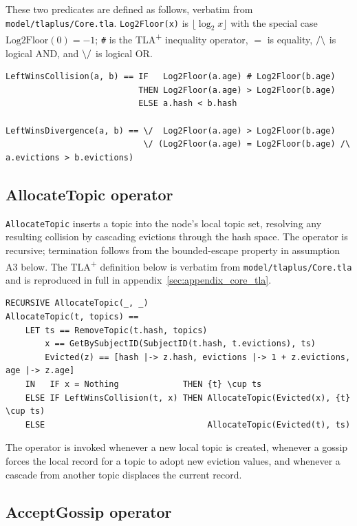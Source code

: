 These two predicates are defined as follows, verbatim from
\texttt{model/tlaplus/Core.tla}. \texttt{Log2Floor(x)} is
$\lfloor \log_2 x \rfloor$ with the special case $\mathrm{Log2Floor}(0) = -1$;
\texttt{\#} is the TLA\textsuperscript{+} inequality operator, $\mathtt{=}$ is
equality, $\mathtt{/\char`\\}$ is logical AND, and $\mathtt{\char`\\/}$ is
logical OR.

\begin{verbatim}
LeftWinsCollision(a, b) == IF   Log2Floor(a.age) # Log2Floor(b.age)
                           THEN Log2Floor(a.age) > Log2Floor(b.age)
                           ELSE a.hash < b.hash

LeftWinsDivergence(a, b) == \/  Log2Floor(a.age) > Log2Floor(b.age)
                            \/ (Log2Floor(a.age) = Log2Floor(b.age) /\ a.evictions > b.evictions)
\end{verbatim}

\subsection{AllocateTopic operator}

\texttt{AllocateTopic} inserts a topic into the node's local topic set, resolving
any resulting collision by cascading evictions through the hash space.
The operator is recursive; termination follows from the bounded-escape property in
assumption A3 below. The TLA\textsuperscript{+} definition below is verbatim
from \texttt{model/tlaplus/Core.tla} and is reproduced in full in
appendix~\ref{sec:appendix_core_tla}.

\begin{verbatim}
RECURSIVE AllocateTopic(_, _)
AllocateTopic(t, topics) ==
    LET ts == RemoveTopic(t.hash, topics)
        x == GetBySubjectID(SubjectID(t.hash, t.evictions), ts)
        Evicted(z) == [hash |-> z.hash, evictions |-> 1 + z.evictions, age |-> z.age]
    IN   IF x = Nothing             THEN {t} \cup ts
    ELSE IF LeftWinsCollision(t, x) THEN AllocateTopic(Evicted(x), {t} \cup ts)
    ELSE                                 AllocateTopic(Evicted(t), ts)
\end{verbatim}

The operator is invoked whenever a new local topic is created, whenever a gossip
forces the local record for a topic to adopt new eviction values, and whenever
a cascade from another topic displaces the current record.

\subsection{AcceptGossip operator}

